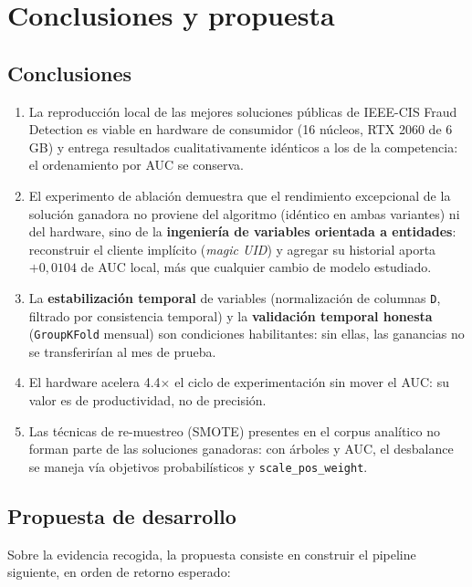 \chapter{Conclusiones y propuesta}
\label{cap:conclusiones}

\section{Conclusiones}

\begin{enumerate}
  \item La reproducción local de las mejores soluciones públicas de IEEE-CIS Fraud Detection es
        viable en hardware de consumidor (16 núcleos, RTX 2060 de 6\,GB) y entrega resultados
        cualitativamente idénticos a los de la competencia: el ordenamiento por AUC se conserva.
  \item El experimento de ablación demuestra que el rendimiento excepcional de la solución
        ganadora no proviene del algoritmo (idéntico en ambas variantes) ni del hardware, sino
        de la \textbf{ingeniería de variables orientada a entidades}: reconstruir el cliente
        implícito (\emph{magic UID}) y agregar su historial aporta $+0{,}0104$ de AUC local,
        más que cualquier cambio de modelo estudiado.
  \item La \textbf{estabilización temporal} de variables (normalización de columnas \texttt{D},
        filtrado por consistencia temporal) y la \textbf{validación temporal honesta}
        (\texttt{GroupKFold} mensual) son condiciones habilitantes: sin ellas, las ganancias no
        se transferirían al mes de prueba.
  \item El hardware acelera 4.4$\times$ el ciclo de experimentación sin mover el AUC: su valor es
        de productividad, no de precisión.
  \item Las técnicas de re-muestreo (SMOTE) presentes en el corpus analítico no forman parte de
        las soluciones ganadoras: con árboles y AUC, el desbalance se maneja vía objetivos
        probabilísticos y \texttt{scale\_pos\_weight}.
\end{enumerate}

\section{Propuesta de desarrollo}
\label{sec:futuro}

Sobre la evidencia recogida, la propuesta consiste en construir el pipeline siguiente, en orden
de retorno esperado:

